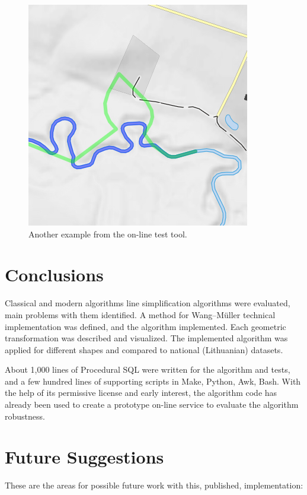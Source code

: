 \documentclass[a4paper]{article}
\newcommand{\WM}{Wang--M{\"u}ller}
\begin{document}
\begin{figure}[ht]
    \centering
    \includegraphics[width=.5\textwidth]{openmap-wm-bad.png}
    \caption{Another example from the on-line test tool.}
    \label{fig:openmap-wm-bad}
\end{figure}

\section{Conclusions}
\label{sec:conclusions}

Classical and modern algorithms line simplification algorithms were evaluated,
main problems with them identified. A method for {\WM} technical
implementation was defined, and the algorithm implemented. Each geometric
transformation was described and visualized. The implemented algorithm was
applied for different shapes and compared to national (Lithuanian) datasets.

About 1,000 lines of Procedural SQL were written for the algorithm and tests,
and a few hundred lines of supporting scripts in Make, Python, Awk, Bash. With
the help of its permissive license and early interest, the algorithm code has
already been used to create a prototype on-line service to evaluate the
algorithm robustness.

\section{Future Suggestions}
\label{sec:future-suggestions}

These are the areas for possible future work with this, published,
implementation:
\end{document}

